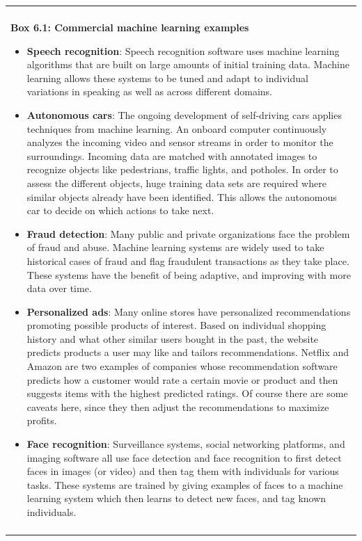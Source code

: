 \documentclass[]{krantz}
\newenvironment{F00}
    {\begin{center}
    \begin{tabular}{|p{0.9\textwidth}|}
    \hline\\
    }
    { 
    \\\\\hline
    \end{tabular} 
    \end{center}
    }
\begin{document}
\begin{F00}
\textbf{Box 6.1: Commercial machine learning examples}

\begin{itemize}
\item
  \textbf{Speech recognition}: Speech recognition software uses machine
  learning algorithms that are built on large amounts of initial
  training data. Machine learning allows these systems to be tuned and
  adapt to individual variations in speaking as well as across different
  domains.
\item
  \textbf{Autonomous cars}: The ongoing development of self-driving cars
  applies techniques from machine learning. An onboard computer
  continuously analyzes the incoming video and sensor streams in order
  to monitor the surroundings. Incoming data are matched with annotated
  images to recognize objects like pedestrians, traffic lights, and
  potholes. In order to assess the different objects, huge training data
  sets are required where similar objects already have been identified.
  This allows the autonomous car to decide on which actions to take
  next.
\item
  \textbf{Fraud detection}: Many public and private organizations face
  the problem of fraud and abuse. Machine learning systems are widely
  used to take historical cases of fraud and flag fraudulent
  transactions as they take place. These systems have the benefit of
  being adaptive, and improving with more data over time.
\item
  \textbf{Personalized ads}: Many online stores have personalized
  recommendations promoting possible products of interest. Based on
  individual shopping history and what other similar users bought in the
  past, the website predicts products a user may like and tailors
  recommendations. Netflix and Amazon are two examples of companies
  whose recommendation software predicts how a customer would rate a
  certain movie or product and then suggests items with the highest
  predicted ratings. Of course there are some caveats here, since they
  then adjust the recommendations to maximize profits.
\item
  \textbf{Face recognition}: Surveillance systems, social networking
  platforms, and imaging software all use face detection and face
  recognition to first detect faces in images (or video) and then tag
  them with individuals for various tasks. These systems are trained by
  giving examples of faces to a machine learning system which then
  learns to detect new faces, and tag known individuals.
\end{itemize}
\end{F00}
\end{document}
